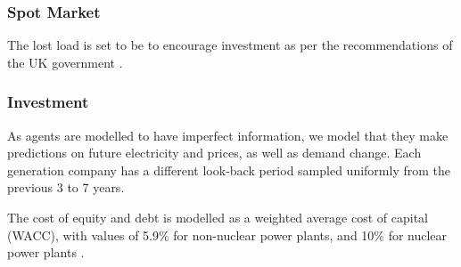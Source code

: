 {\subsubsection{Spot Market}

The lost load is set to be  to encourage investment as per the recommendations of the UK government \cite{DECC2013}.

\subsubsection{Investment}

As agents are modelled to have imperfect information, we model that they make predictions on future electricity and  prices, as well as demand change. Each generation company has a different look-back period sampled uniformly from the previous 3 to 7 years.


The cost of equity and debt is modelled as a weighted average cost of capital (WACC), with values of 5.9\% for non-nuclear power plants, and 10\% for nuclear power plants \cite{KPMG2017, Paper2012}. 

}



